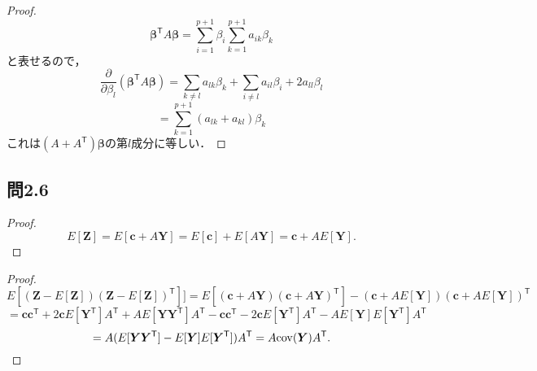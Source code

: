 \documentclass[pdflatex,ja=standard]{bxjsarticle}
\begin{document}
\begin{proof}
\begin{equation}
\bm{\beta}^{\mathsf{T}} A \bm{\beta} =  \sum_{i=1}^{p+1} \beta_i \sum_{k=1}^{p+1} a_{ik} \beta_k
\end{equation}
と表せるので，
\begin{equation}
\frac{\partial}{\partial \beta_l} \left( \bm{\beta}^{\mathsf{T}} A \bm{\beta} \right) = \sum_{k \neq l} a_{lk} \beta_k + \sum_{i \neq l} a_{il} \beta_i + 2 a_{ll} \beta_l
\end{equation}
\begin{equation}
= \sum_{k=1}^{p+1} (a_{lk} + a_{kl}) \beta_k
\end{equation}
これは$(A + A^{\mathsf{T}}) \bm{\beta}$の第$l$成分に等しい．
\end{proof}

\subsection{問2.6}
\begin{proof}
\begin{equation}
E[\bm{Z}] = E[\bm{c} + A \bm{Y}] = E[\bm{c}] + E[A\bm{Y}] = \bm{c} + A E[\bm{Y}].
\end{equation}
\end{proof}

\begin{proof}
\begin{equation}
E[(\bm{Z} - E[\bm{Z}])(\bm{Z} - E[\bm{Z}])^{\mathsf{T}}]] = E[(\bm{c} + A\bm{Y})(\bm{c} + A\bm{Y})^{\mathsf{T}}] - (\bm{c} + A E[\bm{Y}])(\bm{c} + A E[\bm{Y}])^{\mathsf{T}}
\end{equation}
\begin{equation}
= \bm{c} \bm{c}^{\mathsf{T}} + 2 \bm{c} E[\bm{Y}^{\mathsf{T}}] A^{\mathsf{T}} + A E[ \bm{Y} \bm{Y}^{\mathsf{T}}] A^{\mathsf{T}} - \bm{c} \bm{c}^{\mathsf{T}} - 2 \bm{c} E[\bm{Y}^{\mathsf{T}}] A^{\mathsf{T}} -  A E[ \bm{Y}] E[ \bm{Y}^{\mathsf{T}}] A^{\mathsf{T}} 
\end{equation}
\begin{equation}
= A(E[\bm{Y}\bm{Y}^{\mathsf{T}}] - E[\bm{Y}]E[\bm{Y}^{\mathsf{T}}])A^{\mathsf{T}} = A {\rm cov} (\bm{Y}) A^{\mathsf{T}}.
\end{equation}

\end{proof}
\end{document}
